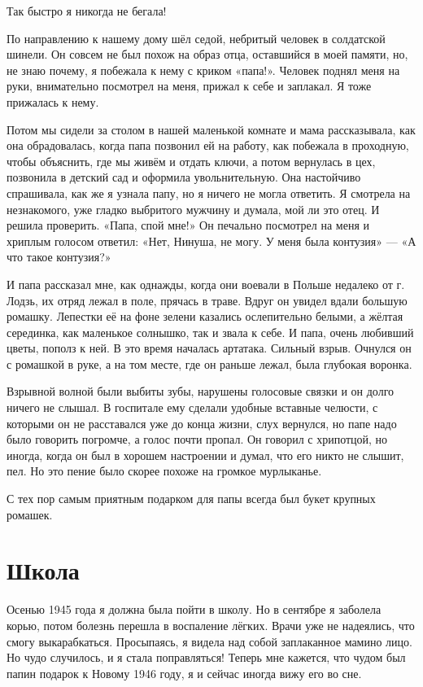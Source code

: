 Так быстро я никогда не бегала!

По направлению к нашему дому шёл седой, небритый человек в солдатской шинели.
Он совсем не был похож на образ отца, оставшийся в моей памяти, но, не знаю почему, я побежала к нему с криком «папа!».
Человек поднял меня на руки, внимательно посмотрел на меня, прижал к себе и заплакал.
Я тоже прижалась к нему.

Потом мы сидели за столом в нашей маленькой комнате и мама рассказывала, как она обрадовалась, когда папа позвонил ей на работу, как побежала в проходную, чтобы объяснить, где мы живём и отдать ключи, а потом вернулась в цех, позвонила в детский сад и оформила увольнительную.
Она настойчиво спрашивала, как же я узнала папу, но я ничего не могла ответить.
Я смотрела на незнакомого, уже гладко выбритого мужчину и думала, мой ли это отец.
И решила проверить.
«Папа, спой мне!» 
Он печально посмотрел на меня и хриплым голосом ответил: 
«Нет, Нинуша, не могу.
У меня была контузия» ---
«А что такое контузия?»

И папа рассказал мне, как однажды, когда они воевали в Польше недалеко от г. Лодзь, их отряд лежал в поле, прячась в траве.
Вдруг он увидел вдали большую ромашку.
Лепестки её на фоне зелени казались ослепительно белыми, а жёлтая серединка, как маленькое солнышко, так и звала к себе.
И папа, очень любивший цветы, пополз к ней.
В это время началась артатака.
Сильный взрыв.
Очнулся он с ромашкой в руке, а на том месте, где он раньше лежал, была глубокая воронка.

Взрывной волной были выбиты зубы, нарушены голосовые связки и он долго ничего не слышал.
В госпитале ему сделали удобные вставные челюсти, с которыми он не расставался уже до конца жизни, слух вернулся, но папе надо было говорить погромче, а голос почти пропал.
Он говорил с хрипотцой, но иногда, когда он был в хорошем настроении и думал, что его никто не слышит, пел.
Но это пение было скорее похоже на громкое мурлыканье.

С тех пор самым приятным подарком для папы всегда был букет крупных ромашек.

\section*{Школа}


Осенью 1945 года я должна была пойти в школу.
Но в сентябре я заболела корью, потом болезнь перешла в воспаление лёгких.
Врачи уже не надеялись, что смогу выкарабкаться.
Просыпаясь, я видела над собой заплаканное мамино лицо.
Но чудо случилось, и я стала поправляться! 
Теперь мне кажется, что чудом был папин подарок к Новому 1946 году, я и сейчас иногда вижу его во сне.

